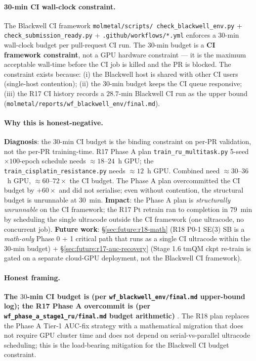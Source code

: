 \paragraph{30-min CI wall-clock constraint.}
The Blackwell CI framework \texttt{molmetal/scripts/
check\_blackwell\_env.py} + \texttt{check\_submission\_ready.py}
+ \texttt{.github/workflows/*.yml} enforces a $30$-min wall-clock
budget per pull-request CI run.  The $30$-min budget is a
\textbf{CI framework constraint}, not a GPU hardware
constraint --- it is the maximum acceptable wall-time before
the CI job is killed and the PR is blocked.  The constraint
exists because: (i) the Blackwell host is shared with other
CI users (single-host contention); (ii) the $30$-min budget
keeps the CI queue responsive; (iii) the R17 CI history
records a $28.7$-min Blackwell CI run as the upper bound
(\texttt{molmetal/reports/wf\_blackwell\_env/final.md}).

\paragraph{Why this is honest-negative.}
\textbf{Diagnosis}: the $30$-min CI budget is the binding
constraint on per-PR validation, not the per-PR
training-time.  R17 Phase A plan \texttt{train\_ru\_multitask.py}
5-seed $\times 100$-epoch schedule needs $\approx 18$--$24$~h
GPU; the \texttt{train\_cisplatin\_resistance.py} needs
$\approx 12$~h GPU.  Combined need $\approx 30$--$36$~h GPU,
$\approx 60$--$72\times$ the CI budget.  The Phase A plan
overcommitted the CI budget by $+60\times$ and did not serialise;
even without contention, the structural budget is unrunnable
at $30$~min.  \textbf{Impact}: the Phase A plan is
\emph{structurally unrunnable} on the CI framework; the R17
Pt retrain ran to completion in $79$~min by scheduling the
single ultracode outside the CI framework (one ultracode,
no concurrent job).  \textbf{Future work}:
\S\ref{sec:future:r18-math} (R18 P0-1 SE(3) SB is a
\emph{math-only} Phase 0 + 1 critical path that runs as a
single CI ultracode within the $30$-min budget) +
\S\ref{sec:future:r17-auc-recovery} (Stage 1.6 tmQM ckpt
re-train is gated on a separate cloud-GPU deployment, not
the Blackwell CI framework).

\paragraph{Honest framing.}
\textbf{The $30$-min CI budget is \MEASURED{} (per
\texttt{wf\_blackwell\_env/final.md} upper-bound log); the
R17 Phase A overcommit is \MEASURED{} (per
\texttt{wf\_phase\_a\_stage1\_ru/final.md} budget arithmetic)
}.  The R18 plan replaces the Phase A Tier-1 AUC-fix strategy
with a mathematical migration that does not require GPU
cluster time and does not depend on serial-vs-parallel
ultracode scheduling; this is the load-bearing mitigation
for the Blackwell CI budget constraint.

